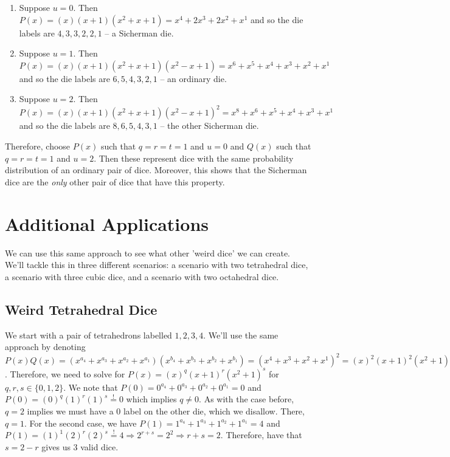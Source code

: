 \documentclass[12pt]{report}
\begin{document}
\begin{enumerate}
\item Suppose $u=0$. Then $P(x)=(x)(x+1)(x^{2}+x+1)=x^{4}+2x^{3}+2x^{2}+x^{1}$ and so the die labels are $4,3,3,2,2,1$ -- a Sicherman die.
\item Suppose $u=1$. Then $P(x)=(x)(x+1)(x^{2}+x+1)(x^{2}-x+1)=x^{6}+x^{5}+x^{4}+x^{3}+x^{2}+x^{1}$ and so the die labels are $6,5,4,3,2,1$ -- an ordinary die.
\item Suppose $u=2$. Then $P(x)=(x)(x+1)(x^{2}+x+1)(x^{2}-x+1)^{2}=x^{8}+x^{6}+x^{5}+x^{4}+x^{3}+x^{1}$ and so the die labels are $8,6,5,4,3,1$ -- the other Sicherman die.
\end{enumerate}

Therefore, choose $P(x)$ such that $q=r=t=1$ and $u=0$ and $Q(x)$ such that $q=r=t=1$ and $u=2$. Then these represent dice with the same probability distribution of an ordinary pair of dice. Moreover, this shows that the Sicherman dice are the \textit{only} other pair of dice that have this property.

\section*{Additional Applications}
We can use this same approach to see what other 'weird dice' we can create. We'll tackle this in three different scenarios: a scenario with two tetrahedral dice, a scenario with three cubic dice, and a scenario with two octahedral dice.

\subsection*{Weird Tetrahedral Dice}
We start with a pair of tetrahedrons labelled $1,2,3,4$. We'll use the same approach by denoting $P(x)Q(x)=(x^{a_{4}}+x^{a_{3}}+x^{a_{2}}+x^{a_{1}})
(x^{b_{4}}+x^{b_{3}}+x^{b_{2}}+x^{b_{1}})=(x^{4}+x^{3}+x^{2}+x^{1})^{2}=(x)^{2}(x+1)^{2}(x^{2}+1)^{2}$. Therefore, we need to solve for $P(x)=(x)^{q}(x+1)^{r}(x^{2}+1)^{s}$ for $q,r,s \in \{0,1,2\}$. We note that $P(0)=0^{a_{4}}+0^{a_{3}}+0^{a_{2}}+0^{a_{1}}=0$ and $P(0)=(0)^{q}(1)^{r}(1)^{s} \stackrel{!}{=} 0$ which implies $q \neq 0$. As with the case before, $q=2$ implies we must have a 0 label on the other die, which we disallow. There, $q=1$. For the second case, we have $P(1)=1^{a_{4}}+1^{a_{3}}+1^{a_{2}}+1^{a_{1}}=4$ and $P(1)=(1)^{1}(2)^{r}(2)^{s} \stackrel{!}{=} 4 \Rightarrow 2^{r+s}=2^{2} \Rightarrow r+s=2$. Therefore, have that $s=2-r$ gives us 3 valid dice. 
\end{document}
